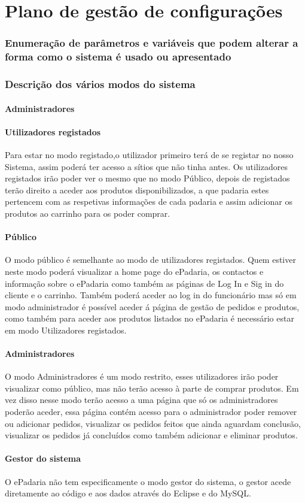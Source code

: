 \chapter{Plano de gestão de configurações}
\label{plano_de_gestao_de_configuracoes}

\subsection{Enumeração de parâmetros e variáveis que podem alterar a forma como o sistema é usado ou apresentado}

\subsection{Descrição dos vários modos do sistema}
\subsubsection{Administradores}
\subsubsection{Utilizadores registados}
Para estar no modo registado,o utilizador primeiro terá de se registar no nosso Sistema, assim poderá ter acesso a sítios que não tinha antes. Os utilizadores registados irão poder ver o mesmo que no modo Público, depois de registados terão direito a aceder aos produtos disponibilizados, a que padaria estes pertencem com as respetivas informações de cada padaria e assim adicionar os produtos ao carrinho para os poder comprar.
\subsubsection{Público}
O modo público é semelhante ao modo de utilizadores registados. Quem estiver neste modo poderá visualizar a home page do ePadaria, os contactos e informação sobre o ePadaria como também as páginas de Log In e Sig in do cliente e o carrinho. Também poderá aceder ao log in do funcionário mas só em modo administrador é possível aceder á página de gestão de pedidos e produtos, como também para aceder aos produtos listados no ePadaria é necessário estar em modo Utilizadores registados.
\subsubsection{Administradores}
O modo Administradores é um modo restrito, esses utilizadores irão poder visualizar como público, mas não terão acesso à parte de comprar produtos. Em vez disso nesse modo terão acesso a uma página que só os administradores poderão aceder, essa página contém acesso para o administrador poder remover ou adicionar pedidos, visualizar os pedidos feitos que ainda aguardam conclusão, visualizar os pedidos já concluídos como também adicionar e eliminar produtos.
\subsubsection{Gestor do sistema}
O ePadaria não tem especificamente o modo gestor do sistema, o gestor acede diretamente ao código e aos dados através do Eclipse e do MySQL.